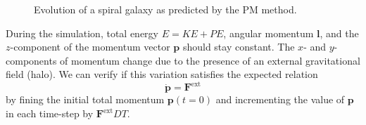 \begin{figure}[htp]
    \caption{Evolution of a spiral galaxy as predicted by the PM method.}
    \label{fig:spiral-galaxy-evolution-pm}
\end{figure}

During the simulation, total energy $E = KE + PE$, angular momentum $\mathbf{l}$, and the $z$-component of the momentum vector $\mathbf{p}$ should stay constant.
The $x$- and $y$-components of momentum change due to the presence of an external gravitational field (halo).
We can verify if this variation satisfies the expected relation
\begin{equation}\label{eq:expected-momentum-change}
    \dot{\mathbf{p}} = \mathbf{F}^\text{ext}
\end{equation}
by fining the initial total momentum $\mathbf{p}(t = 0)$ and incrementing the value of $\mathbf{p}$ in each time-step by $\mathbf{F}^\text{ext}DT$.

